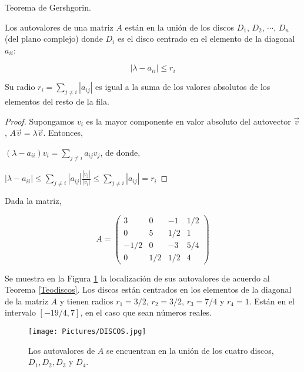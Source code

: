 \begin{corollary}
\label{Teodiscos}
Teorema de Gershgorin. 

Los autovalores de una matriz $A$ están en la unión de los discos $D_1$, $D_2$, $\cdots$, $D_n$ (del plano complejo) donde $D_i$ es el disco centrado en el elemento de la diagonal $a_{ii}$: 

$$|\lambda-a_{ii}|  \leq  r_i  $$

Su radio $r_i=\sum_{j \neq i} |a_{ij}|$ es igual a la suma de los valores absolutos de los elementos del resto de la fila.


\begin{proof}
Supongamos $v_i$ es la mayor componente en valor absoluto del autovector  $\vec{v}$,  $ A\vec{v}=\lambda \vec{v}$. Entonces,

\bigskip

$(\lambda-a_{ii})v_i= \sum_{j \neq i} a_{ij} v_j$, de donde, 

\bigskip

$|\lambda-a_{ii}|  \leq  \sum_{j \neq i} |a_{ij}| \frac{   |v_j|}{ |v_i| } \leq  \sum_{j \neq i} |a_{ij}|=r_i  $

\end{proof}
\end{corollary}

\bigskip


\begin{example}
Dada la matriz,

\bigskip

$$A=\left(\begin{array}{cccc} 3 & 0 &  -1 & 1/2 \\ 0 & 5   & 1/2 & 1
\\  -1/2  &  0 &  -3 &   5/4

\\   0 & 1/2 &  1/2 & 4 
\end{array}
 \right)$$

 \bigskip

 
Se muestra en la Figura \ref{DISCOS} la localización de sus autovalores de acuerdo al Teorema \ref{Teodiscos}. Los discos están centrados en los elementos de la diagonal de la matriz $A$ y tienen radios $r_1=3/2$, $r_2=3/2$, $r_3=7/4$ y $r_4=1$. Están en el intervalo $[-19/4,7]$, en el caso que sean números reales.

 \bigskip
 
\begin{figure}
    \centering
    \texttt{[image: Pictures/DISCOS.jpg]}
    \caption{Los autovalores de $A$ se encuentran en la unión de los cuatro discos, $D_1, D_2, D_3$ y $D_4$.}
    \label{DISCOS}
\end{figure}


\end{example}
\bigskip


